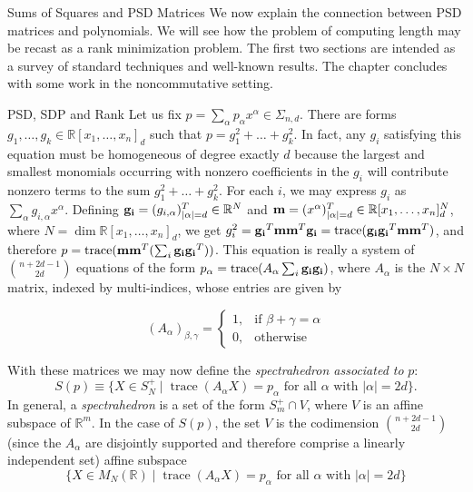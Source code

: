 \documentclass[12pt,oneside,final]{ucthesisucsbmath2010}
\newcommand{\R}{\mathbb{R}}
\newcommand{\snd}{\Sigma_{n,d}}
\newcommand{\pn}{\R[x_1,\ldots,x_n]}
\DeclareMathOperator{\trace}{trace}
\theoremstyle{definition}
\begin{document}
								
\begin{chapter}{Sums of Squares and PSD Matrices}
We now explain the connection between PSD matrices and polynomials. We will see how the problem of computing length may be recast as a rank minimization problem. The first two sections are intended as a survey of standard techniques and well-known results. The chapter concludes with some work in the noncommutative setting.
\begin{section}{PSD, SDP and Rank}
Let us fix $p = \sum_\alpha p_\alpha x^\alpha \in \snd$. There are forms $g_1,\ldots,g_k \in \pn_d$ such that $p = g_1^2+\ldots+g_k^2$. In fact, any $g_i$ satisfying this equation must be homogeneous of degree exactly $d$ because the largest and smallest monomials occurring with nonzero coefficients in the $g_i$ will contribute nonzero terms to the sum $g_1^2+\ldots+g_k^2$. For each $i$, we may express $g_i$ as $\sum_\alpha g_{i,\alpha}x^\alpha$. Defining ${\bf g_i} = (g_{i,\alpha})_{|\alpha|=d}^T \in \R^N$ and ${\bf m} = (x^\alpha)_{|\alpha|=d}^T \in \pn_d^N$, where $N = \dim \pn_d$, we get $g_i^2 = {\bf g_i}^T {\bf m} {\bf m}^T {\bf g_i}=\trace( {\bf g_i}{\bf g_i}^T{\bf m}{\bf m}^T)$, and therefore $p = \trace({\bf m}{\bf m}^T(\sum_i{\bf g_i}{\bf g_i}^T))$. This equation is really a system of $\binom{n+2d-1}{2d}$ equations of the form $p_\alpha = \trace(A_\alpha \sum_i{\bf g_i}{\bf g_i})$, where $A_\alpha$ is the $N\times N$ matrix, indexed by multi-indices, whose entries are given by

\[(A_\alpha)_{\beta,\gamma} = 
\begin{cases}
1, & \text{if }\beta+\gamma=\alpha \\
0, & \text{otherwise }
\end{cases}
\]

With these matrices we may now define the \emph{spectrahedron associated to} $p$:
\[S(p)\equiv \{X \in S_N^+ \mid \trace(A_\alpha X) = p_\alpha \text{ for all } \alpha \text{ with } |\alpha|=2d\}.\]
In general, a \emph{spectrahedron} is a set of the form $S_m^+ \cap V$, where $V$ is an affine subspace of $\R^m$. In the case of $S(p)$, the set $V$ is the codimension $\binom{n+2d-1}{2d}$ (since the $A_\alpha$ are disjointly supported and therefore comprise a linearly independent set) affine subspace
\[\{X \in M_N(\R) \mid \trace(A_\alpha X) = p_\alpha \text{ for all } \alpha \text{ with } |\alpha|=2d\}\] 


\end{section}
\end{chapter}
\end{document}
